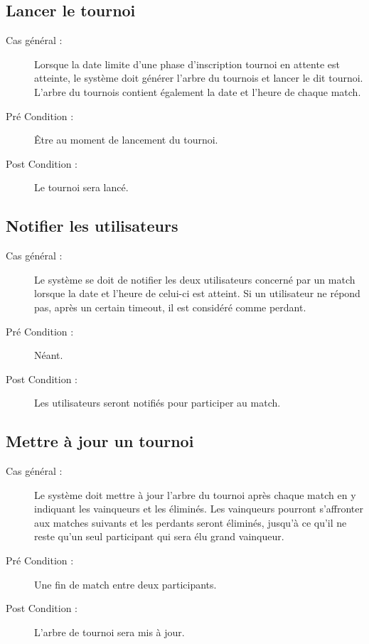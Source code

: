 \documentclass[a4paper]{report}
\begin{document}
\subsection{Lancer le tournoi}
\begin{description}
    \item[Cas général :] Lorsque la date limite d'une phase d'inscription tournoi en attente est atteinte, le système doit générer l'arbre du tournois et lancer le dit tournoi. L'arbre du tournois contient également la date et l'heure de chaque match.
    \item[Pré Condition  :] Être au moment de lancement du tournoi.
    \item[Post Condition :] Le tournoi sera lancé.
\end{description}

\subsection{Notifier les \glspl{utilisateur}}
\begin{description}
    \item[Cas général :] Le système se doit de notifier les deux \glspl{utilisateur} concerné par un match lorsque la date et l'heure de celui-ci est atteint. Si un \gls{utilisateur} ne répond pas, après un certain timeout, il est considéré comme perdant.
    \item[Pré Condition  :] Néant.
    \item[Post Condition :] Les \glspl{utilisateur} seront notifiés pour participer au match.
\end{description}

\subsection{Mettre à jour un tournoi}
\begin{description}
    \item[Cas général :] Le système doit mettre à jour l'arbre du tournoi après chaque match en y indiquant les vainqueurs et les éliminés. Les vainqueurs pourront s'affronter aux matches suivants et les perdants seront éliminés, jusqu'à ce qu'il ne reste qu'un seul \gls{participant} qui sera élu grand vainqueur.
    \item[Pré Condition  :] Une fin de match entre deux \glspl{participant}.
    \item[Post Condition :] L'arbre de tournoi sera mis à jour.
\end{description}
\end{document}
